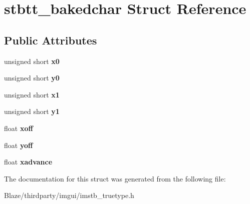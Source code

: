 \hypertarget{structstbtt__bakedchar}{}\section{stbtt\+\_\+bakedchar Struct Reference}
\label{structstbtt__bakedchar}
\subsection*{Public Attributes}
\begin{DoxyCompactItemize}
\item 
\mbox{\label{structstbtt__bakedchar_a8011a0ed0410de9fa405c9cb1ab43da2}} 
unsigned short {\bfseries x0}
\item 
\mbox{\label{structstbtt__bakedchar_aec4def12c086e0038ba32ff33ee78644}} 
unsigned short {\bfseries y0}
\item 
\mbox{\label{structstbtt__bakedchar_a72c22c32abde95a5ba02925b8bd892bf}} 
unsigned short {\bfseries x1}
\item 
\mbox{\label{structstbtt__bakedchar_ac831dc667f6c39b5d22740c6cbd5bc3f}} 
unsigned short {\bfseries y1}
\item 
\mbox{\label{structstbtt__bakedchar_a0708a6588a2768b68a3ae59002944b7c}} 
float {\bfseries xoff}
\item 
\mbox{\label{structstbtt__bakedchar_aba01393e52d1c6f4ce86a8b51e498bb4}} 
float {\bfseries yoff}
\item 
\mbox{\label{structstbtt__bakedchar_ad77b35d1a849d9eb7edb91df05b10536}} 
float {\bfseries xadvance}
\end{DoxyCompactItemize}


The documentation for this struct was generated from the following file\+:\begin{DoxyCompactItemize}
\item 
Blaze/thirdparty/imgui/imstb\+\_\+truetype.\+h\end{DoxyCompactItemize}
